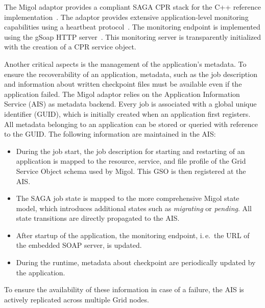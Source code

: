 \documentclass[times, 10pt,twocolumn]{article}
\begin{document}
The Migol adaptor provides a compliant SAGA CPR stack for the C++ reference implementation~\cite{Kaiser:2006qp}. The adaptor provides extensive application-level monitoring capabilities using a heartbeat protocol~\cite{Hanmer:2007kx}. The monitoring endpoint is implemented using the gSoap HTTP server~\cite{gsoap}. This monitoring server is transparently initialized with the creation of a CPR service object. 


Another critical aspects is the management of the application's metadata. To ensure the recoverability of an application, metadata, such as the job description and information about written checkpoint files must be available even if the application failed. The Migol adaptor relies on the Application Information Service (AIS) as metadata backend. Every job is associated with a global unique identifier (GUID), which is initially created when an application first registers. All metadata belonging to an application can be stored or queried with reference to the GUID. The following information are maintained in the AIS:
\begin{itemize}
    \item During the job start, the job description for starting and restarting of an application is mapped to the resource, service, and file profile of the Grid Service Object schema used by Migol. This GSO is then registered at the AIS.
    \item The SAGA job state is mapped to the more comprehensive Migol state model, which introduces additional states such as \emph{migrating} or \emph{pending}. All state transitions are directly propagated to the AIS. 
    \item After startup of the application, the monitoring endpoint, i.\,e.\ the URL of the embedded SOAP server, is updated.
    \item During the runtime, metadata about checkpoint are periodically updated by the application.
\end{itemize}
To ensure the availability of these information in case of a failure, the AIS is actively replicated across multiple Grid nodes.

                                                  
\end{document}
